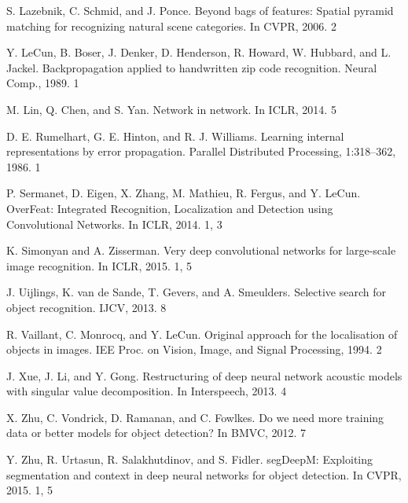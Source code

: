 \par [14] S. Lazebnik, C. Schmid, and J. Ponce. Beyond bags of features: Spatial pyramid matching for recognizing natural scene categories. In CVPR, 2006. 2
\par [15] Y. LeCun, B. Boser, J. Denker, D. Henderson, R. Howard, W. Hubbard, and L. Jackel. Backpropagation applied to handwritten zip code recognition. Neural Comp., 1989. 1
\par [16] M. Lin, Q. Chen, and S. Yan. Network in network. In ICLR, 2014. 5
\par [17] D. E. Rumelhart, G. E. Hinton, and R. J. Williams. Learning internal representations by error propagation. Parallel Distributed Processing, 1:318–362, 1986. 1
\par [18] P. Sermanet, D. Eigen, X. Zhang, M. Mathieu, R. Fergus, and Y. LeCun. OverFeat: Integrated Recognition, Localization and Detection using Convolutional Networks. In ICLR, 2014. 1, 3
\par [19] K. Simonyan and A. Zisserman. Very deep convolutional networks for large-scale image recognition. In ICLR, 2015. 1, 5
\par [20] J. Uijlings, K. van de Sande, T. Gevers, and A. Smeulders. Selective search for object recognition. IJCV, 2013. 8
\par [21] R. Vaillant, C. Monrocq, and Y. LeCun. Original approach for the localisation of objects in images. IEE Proc. on Vision, Image, and Signal Processing, 1994. 2
\par [22] J. Xue, J. Li, and Y. Gong. Restructuring of deep neural network acoustic models with singular value decomposition. In Interspeech, 2013. 4
\par [23] X. Zhu, C. Vondrick, D. Ramanan, and C. Fowlkes. Do we need more training data or better models for object detection? In BMVC, 2012. 7
\par [24] Y. Zhu, R. Urtasun, R. Salakhutdinov, and S. Fidler. segDeepM: Exploiting segmentation and context in deep neural networks for object detection. In CVPR, 2015. 1, 5
